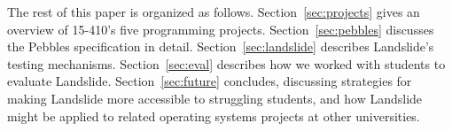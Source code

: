 
The rest of this paper is organized as follows.
Section~\ref{sec:projects} gives an overview of 15-410's five programming projects.
Section~\ref{sec:pebbles} discusses the Pebbles specification in detail.
Section~\ref{sec:landslide} describes Landslide's testing mechanisms.
Section~\ref{sec:eval} describes how we worked with students to evaluate Landslide.
Section~\ref{sec:future} concludes, discussing strategies for making Landslide more accessible to struggling students, and how Landslide might be applied to related operating systems projects at other universities.
